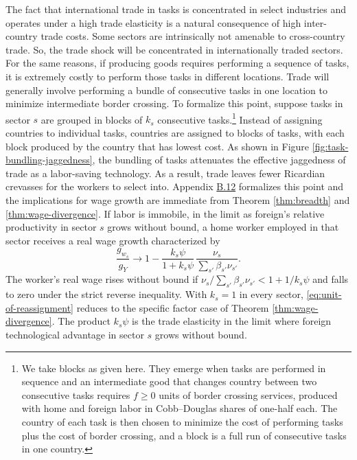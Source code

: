 \documentclass[11pt]{article}
\begin{document}
The fact that international trade in tasks is concentrated in select
industries and operates under a high trade elasticity is a natural
consequence of high inter-country trade costs. Some sectors are intrinsically
not amenable to cross-country trade. So, the trade shock will be concentrated
in internationally traded sectors. For the same reasons, if producing
goods requires performing a sequence of tasks, it is extremely costly
to perform those tasks in different locations. Trade will generally
involve performing a bundle of consecutive tasks in one location to
minimize intermediate border crossing. To formalize this point, suppose
tasks in sector $s$ are grouped in blocks of $k_{s}$ consecutive
tasks.\footnote{We take blocks as given here. They emerge when tasks are performed
in sequence and an intermediate good that changes country between
two consecutive tasks requires $f\ge0$ units of border crossing services,
produced with home and foreign labor in Cobb--Douglas shares of one-half
each. The country of each task is then chosen to minimize the cost
of performing tasks plus the cost of border crossing, and a block
is a full run of consecutive tasks in one country.} Instead of assigning countries to individual tasks, countries are
assigned to blocks of tasks, with each block produced by the country
that has lowest cost. As shown in Figure \ref{fig:task-bundling-jaggedness},
the bundling of tasks attenuates the effective jaggedness of trade
as a labor-saving technology. As a result, trade leaves fewer Ricardian
crevasses for the workers to select into. Appendix \href{https://ahmadlp.github.io/Lashkaripour_AI_Displacement_Online_Appendix.pdf\#page=69}{B.12}
formalizes this point and the implications for wage growth are immediate
from Theorem \ref{thm:breadth} and \ref{thm:wage-divergence}. If
labor is immobile, in the limit as foreign's relative productivity
in sector $s$ grows without bound, a home worker employed in that
sector receives a real wage growth characterized by
\begin{equation}
\frac{g_{w_{s}}}{g_{Y}}\longrightarrow1-\frac{k_{s}\psi}{1+k_{s}\psi}\,\frac{\nu_{s}}{\sum_{s'}\beta_{s'}\nu_{s'}}.\label{eq:unit-of-reassignment}
\end{equation}
The worker's real wage rises without bound if $\nu_{s}/\sum_{s'}\beta_{s'}\nu_{s'}<1+1/k_{s}\psi$
and falls to zero under the strict reverse inequality. With $k_{s}=1$
in every sector, \eqref{eq:unit-of-reassignment} reduces to the specific
factor case of Theorem \ref{thm:wage-divergence}. The product $k_{s}\psi$
is the trade elasticity in the limit where foreign technological advantage
in sector $s$ grows without bound.
\end{document}
